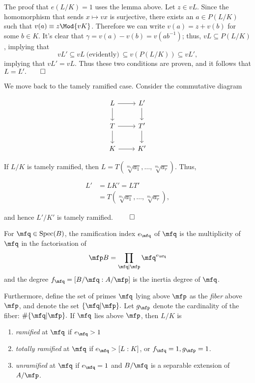 \documentclass[a4paper, 12pt,oneside,openany]{book}
\begin{document}
The proof that $e(L/K)=1$ uses the lemma above. Let $z\in vL$. Since the homomorphism that sends $x \mapsto vx$ is surjective, there exists an $a \in P(L/K)$ such that $v(a) \equiv z\Mod{vK}$. Therefore we can write $v(a)=z+v(b)$ for some $b \in K$. It's clear that $\gamma = v(a)-v(b)=v(ab^{-1})$; thus, $vL \subseteq P(L/K)$, implying that $$vL' \subseteq vL\ \text{(evidently)}\ \subseteq v(P(L/K)) \subseteq vL',$$ implying that $vL'=vL$. Thus these two conditions are proven, and it follows that $L=L'. \qed$ 

We move back to the tamely ramified case. Consider the commutative diagram

\[
\begin{tikzcd}
L \arrow{r} \arrow{d} & L' \arrow{d} \\
T \arrow{r} \arrow{d} & T'  \arrow{d}\\
K \arrow{r} & K' 
\end{tikzcd}
\]

If $L/K$ is tamely ramified, then $L=T(\sqrt[m_1]{a_1}, \dots, \sqrt[m_r]{a_r})$. Thus, 

\begin{align*} L' &= LK' =LT' \\
&= T(\sqrt[m_1]{a_1}, \dots, \sqrt[m_r]{a_r}),
\end{align*}

and hence $L'/K'$ is tamely ramified. $\qed$

For $\mfq \in \text{Spec}(B)$, the ramification index $e_{\mfq}$ of $\mfq$ is the multiplicity of $\mfq$ in the factorisation of $$\mfp B = \prod\limits_{\mfq \mid \mfp} \mfq^{e_\mfq}$$ and the degree $f_\mfq = [B/\mfq:A/\mfp]$ is the inertia degree of $\mfq$. 

Furthermore, define the set of primes $\mfq$ lying above $\mfp$ as the \emph{fiber} above $\mfp$, and denote the set $\{\mfq | \mfp\}.$ Let $g_{\mfp}$ denote the cardinality of the fiber: $\#\{\mfq | \mfp\}.$ If $\mfq$ lies above $\mfp$, then $L/K$ is \begin{enumerate} 

\item \emph{ramified} at $\mfq$ if $e_{\mfq}>1$
\item \emph{totally ramified} at $\mfq$ if $e_{\mfq}>[L:K]$, or $f_\mfq=1, g_\mfp=1$.
\item \emph{unramified} at $\mfq$ if $e_{\mfq}=1$ and $B/\mfq$ is a separable extension of $A/\mfp$.

\end{enumerate}
\end{document}
